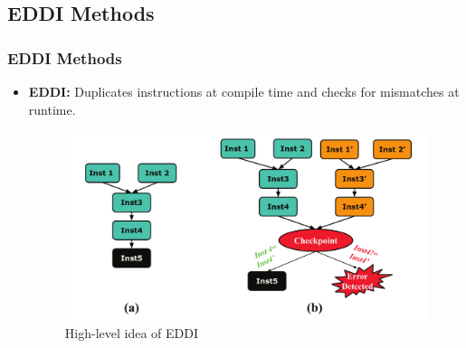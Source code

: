 \documentclass[
	12pt, %
]{beamer}
\begin{document}
\subsection{EDDI Methods}
\begin{frame}
	\frametitle{EDDI Methods}
	
	\begin{itemize}
		\item \textbf{EDDI:} 
		Duplicates instructions at compile time and checks for mismatches at runtime.
		
		
		\begin{figure}
			\includegraphics[width=0.9\linewidth]{img1.png}
			\caption{High-level idea of EDDI}
			\label{High-level idea of EDDI}
		\end{figure}
	\end{itemize}
	
	
	
	
	
	
%	
%	
%	
\end{frame}
\end{document}
